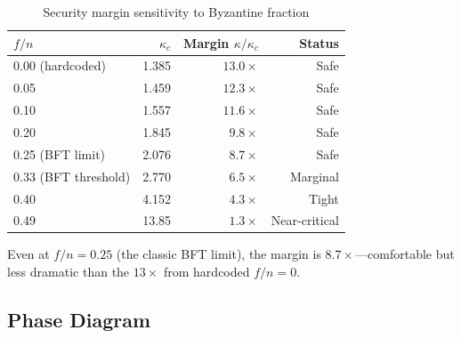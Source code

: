 \documentclass[11pt,a4paper]{article}
\begin{document}
\begin{table}[H]
\centering
\caption{Security margin sensitivity to Byzantine fraction}
\label{tab:margin}
\begin{tabular}{@{}lrrr@{}}
\toprule
$f/n$ & $\kappa_c$ & Margin $\kappa/\kappa_c$ & \textbf{Status} \\
\midrule
0.00 (\textcolor{hardcoded}{hardcoded}) & 1.385 & $13.0\times$ & Safe \\
0.05 & 1.459 & $12.3\times$ & Safe \\
0.10 & 1.557 & $11.6\times$ & Safe \\
0.20 & 1.845 & $9.8\times$ & Safe \\
0.25 (BFT limit) & 2.076 & $8.7\times$ & Safe \\
0.33 (BFT threshold) & 2.770 & $6.5\times$ & Marginal \\
0.40 & 4.152 & $4.3\times$ & Tight \\
0.49 & 13.85 & $1.3\times$ & Near-critical \\
\bottomrule
\end{tabular}
\end{table}

Even at $f/n = 0.25$ (the classic BFT limit), the margin is $8.7\times$---comfortable but less dramatic than the $13\times$ from hardcoded $f/n = 0$.

\subsection{Phase Diagram}
\end{document}
